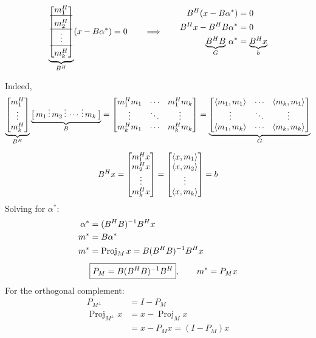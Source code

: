 \begin{gather*}
\underbrace{\bmat{m_1\Hm\\ \hline \rule{0pt}{2.8ex}m_2\Hm\\ \hline \rule{0pt}{2.8ex}\vdots\\ \hline \rule{0pt}{2.8ex}m_k\Hm}}_{B\Hm}(x-B\alpha^*) = 0
\qquad\Longrightarrow\qquad
\begin{aligned}
B\Hm(x-B\alpha^*) &= 0\\
B\Hm x - B\Hm B\alpha^* &= 0\\
\underbrace{B\Hm B}_{G}\,\alpha^* &= \underbrace{B\Hm x}_{b}
\end{aligned}
\end{gather*}

Indeed,
\begin{gather*}
\underbrace{\begin{bmatrix}m_1^{H}\\ \vdots\\ m_k^{H}\end{bmatrix}}_{B^{H}}
\underbrace{\big[\, m_1 \,\vdots\, m_2 \,\vdots\, \cdots \,\vdots\, m_k\,\big]}_{B}
= \begin{bmatrix}m_1^{H} m_1 & \cdots & m_1^{H} m_k\\ \vdots & \ddots & \vdots\\ m_k^{H} m_1 & \cdots & m_k^{H} m_k\end{bmatrix}
= \underbrace{\begin{bmatrix}\left\langle m_1, m_1 \right\rangle & \cdots & \left\langle m_k, m_1 \right\rangle\\ \vdots & \ddots & \vdots\\ \left\langle m_1, m_k \right\rangle & \cdots & \left\langle m_k, m_k \right\rangle\end{bmatrix}}_{G}\\[6pt]
B^{H} x = \begin{bmatrix}m_1^{H} x\\ m_2^{H} x\\ \vdots\\ m_k^{H} x\end{bmatrix} = \begin{bmatrix}\left\langle x, m_1 \right\rangle\\ \left\langle x, m_2 \right\rangle\\ \vdots\\ \left\langle x, m_k \right\rangle\end{bmatrix} = b
\end{gather*}
Solving for $\alpha^*$:
\begin{align*}
\alpha^* &= (B^{H} B)^{-1}B^{H} x\\
m^* &= B\alpha^*\\
m^* &= \operatorname{Proj}_M x = B(B^{H} B)^{-1}B^{H} x\\[4pt]
&\boxed{P_M = B(B^{H} B)^{-1}B^{H}}, \qquad m^* = P_M x
\end{align*}
For the orthogonal complement:
\begin{align*}
P_{M^\perp} &= I-P_M\\
\operatorname{Proj}_{M^\perp} x &= x-\operatorname{Proj}_M x\\
&= x - P_M x = (I-P_M)x
\end{align*}

